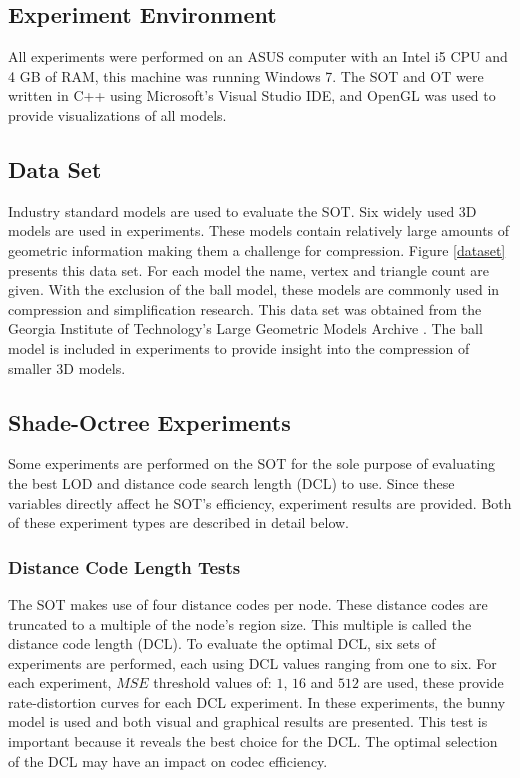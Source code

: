 \subsection{Experiment Environment}

All experiments were performed on an ASUS computer with an Intel i5 CPU and 4 GB of RAM, this machine was running Windows 7. The SOT and OT were written in C++ using Microsoft's Visual Studio IDE, and OpenGL was used to provide visualizations of all models.

\subsection{Data Set}

Industry standard models are used to evaluate the SOT. Six widely used 3D models are used in experiments. These models contain relatively large amounts of geometric information making them a challenge for compression. Figure \ref{dataset} presents this data set. For each model the name, vertex and triangle count are given. With the exclusion of the ball model, these models are commonly used in compression and simplification research. This data set was obtained from the Georgia Institute of Technology's Large Geometric Models Archive \cite{LargeGeometricModelsArchive}. The ball model is included in experiments to provide insight into the compression of smaller 3D models. 


\subsection{Shade-Octree Experiments}

Some experiments are performed on the SOT for the sole purpose of evaluating the best LOD and distance code search length (DCL) to use. Since these variables directly affect he SOT's efficiency, experiment results are provided. Both of these experiment types are described in detail below.


\subsubsection{Distance Code Length Tests}

The SOT makes use of four distance codes per node. These distance codes are truncated to a multiple of the node's region size. This multiple is called the distance code length (DCL). To evaluate the optimal DCL, six sets of experiments are performed, each using DCL values ranging from one to six. For each experiment, $MSE$ threshold values of: $1$, $16$ and $512$ are used, these provide rate-distortion curves for each DCL experiment. In these experiments, the bunny model is used and both visual and graphical results are presented. This test is important because it reveals the best choice for the DCL. The optimal selection of the DCL may have an impact on codec efficiency. 

